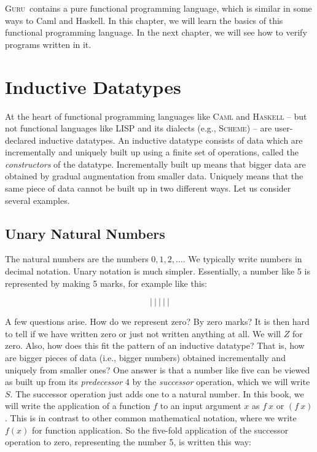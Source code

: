 \documentclass{book}[12pt]
\newcommand{\guru}[0]{\textsc{Guru}}
\begin{document}
\guru\ contains a pure functional programming language, which is
similar in some ways to Caml and Haskell.  In this chapter, we will
learn the basics of this functional programming language.  In the next
chapter, we will see how to verify programs written in it.

\section{Inductive Datatypes}

At the heart of functional programming languages like \textsc{Caml}
and \textsc{Haskell} -- but not functional languages like
\textsc{LISP} and its dialects (e.g., \textsc{Scheme}) -- are
user-declared inductive datatypes.  An inductive datatype consists of
data which are incrementally and uniquely built up using a finite set
of operations, called the \emph{constructors} of the datatype.
Incrementally built up means that bigger data are obtained by gradual
augmentation from smaller data.  Uniquely means that the same piece of
data cannot be built up in two different ways.  Let us consider
several examples.

\subsection{Unary Natural Numbers}

The natural numbers are the numbers $0,1,2,\ldots$.  We typically
write numbers in decimal notation.  Unary notation is much simpler.
Essentially, a number like 5 is represented by making 5 marks, for
example like this:

\[ |\ |\ |\ |\ | \]

\noindent A few questions arise.  How do we represent zero?  By zero
marks?  It is then hard to tell if we have written zero or just not
written anything at all.  We will $Z$ for zero.  Also, how does this
fit the pattern of an inductive datatype?  That is, how are bigger
pieces of data (i.e., bigger numbers) obtained incrementally and
uniquely from smaller ones?  One answer is that a number like five can
be viewed as built up from its \emph{predecessor} 4 by the
\emph{successor} operation, which we will write $S$.  The successor
operation just adds one to a natural number.  In this book, we will
write the application of a function $f$ to an input argument $x$ as
$f\ x$ or $(f\ x)$.  This is in contrast to other common mathematical
notation, where we write $f(x)$ for function application.  So the
five-fold application of the successor operation to zero, representing
the number 5, is written this way:
\end{document}
